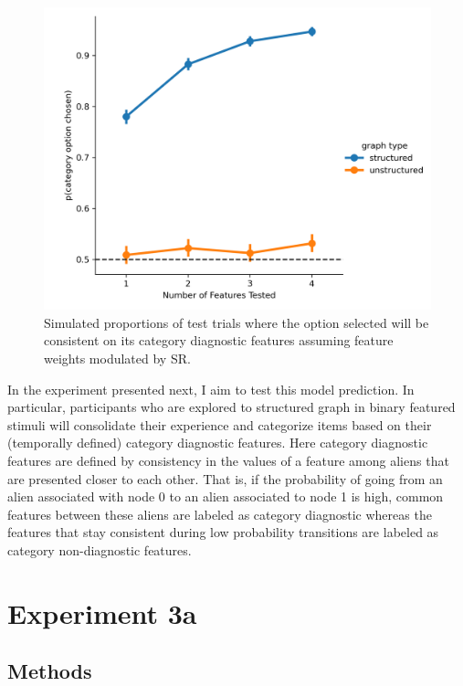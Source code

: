 \begin{figure}[ht]
    \centering
    \includegraphics[width = \textwidth]{chapter_notebooks/chapter_4/figures/cat_simulations.png}
    \caption{Simulated proportions of test trials where the option selected will be consistent on its category diagnostic features assuming feature weights modulated by SR.}
    \label{fig:sr-cat-selection-sims}
\end{figure}

In the experiment presented next, I aim to test this model prediction. In particular, participants who are explored to structured graph in binary featured stimuli will consolidate their experience and categorize items based on their (temporally defined) category diagnostic features. Here category diagnostic features are defined by consistency in the values of a feature among aliens that are presented closer to each other. That is, if the probability of going from an alien associated with node 0 to an alien associated to node 1 is high, common features between these aliens are labeled as category diagnostic whereas the features that stay consistent during low probability transitions are labeled as category non-diagnostic features. 

\section{Experiment 3a}

\subsection{Methods}

